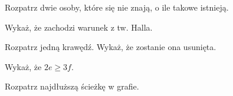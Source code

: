
\begin{hints_list}
	\item Rozpatrz dwie osoby, które się nie znają, o ile takowe istnieją. 
	\item Wykaż, że zachodzi warunek z tw. Halla.
	\item Rozpatrz jedną krawędź. Wykaż, że zostanie ona usunięta. 
	\item Wykaż, że $2e \geqslant 3f$.
	\item Rozpatrz najdłuższą ścieżkę w grafie.
	\item 
\end{hints_list}